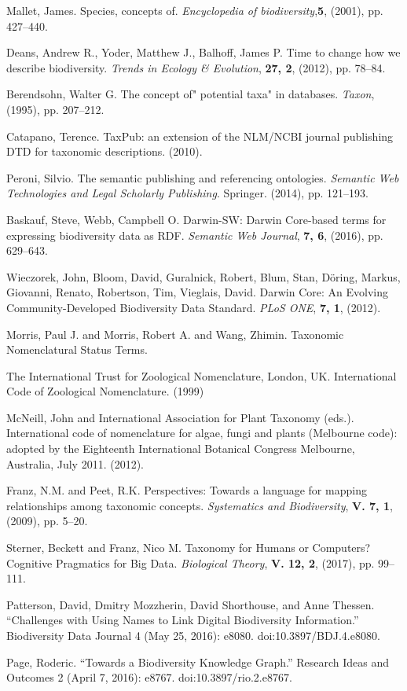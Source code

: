 \documentclass{IOS-Book-Article}
\begin{document}
\begin{thebibliography}{99}
Mallet, James. Species, concepts of. \textit{Encyclopedia of biodiversity},\textbf{5}, (2001), pp. 427--440.

Deans, Andrew R., Yoder, Matthew J., Balhoff, James P. Time to change how we describe biodiversity. \textit{Trends in Ecology \& Evolution}, \textbf{27, 2}, (2012), pp. 78--84.

Berendsohn, Walter G. The concept of" potential taxa" in databases. \textit{Taxon}, (1995), pp. 207--212.

Catapano, Terence. {TaxPub}: an extension of the {NLM}/{NCBI} journal publishing {DTD} for taxonomic descriptions. (2010).


Peroni, Silvio. The semantic publishing and referencing ontologies. \textit{Semantic {Web} {Technologies} and {Legal} {Scholarly} {Publishing}}. Springer. (2014), pp. 121--193.

Baskauf, Steve, Webb, Campbell O. Darwin-{SW}: {Darwin} {Core}-based terms for expressing biodiversity data as {RDF}. \textit{Semantic Web Journal}, \textbf{7, 6}, (2016), pp. 629--643.

Wieczorek, John, Bloom, David, Guralnick, Robert, Blum, Stan, Döring, Markus, Giovanni, Renato, Robertson, Tim, Vieglais, David. Darwin {Core}: {An} {Evolving} {Community}-{Developed} {Biodiversity} {Data} {Standard}. \textit{PLoS ONE}, \textbf{7, 1}, (2012).

Morris, Paul J. and Morris, Robert A. and Wang, Zhimin. Taxonomic {Nomenclatural} {Status} {Terms}.

{The International Trust for Zoological Nomenclature, London, UK}. International {Code} of {Zoological} {Nomenclature}. (1999)

McNeill, John and International Association for Plant Taxonomy (eds.). International code of nomenclature for algae, fungi and plants ({Melbourne} code): adopted by the {Eighteenth} {International} {Botanical} {Congress} {Melbourne}, {Australia}, {July} 2011. (2012).

Franz, N.M. and Peet, R.K. Perspectives: {Towards} a language for mapping relationships among taxonomic concepts. \textit{Systematics and Biodiversity}, \textbf{V. 7, 1}, (2009), pp. 5--20.

Sterner, Beckett and Franz, Nico M. Taxonomy for {Humans} or {Computers}? {Cognitive} {Pragmatics} for {Big} {Data}. \textit{Biological Theory}, \textbf{V. 12, 2}, (2017), pp. 99--111.

Patterson, David, Dmitry Mozzherin, David Shorthouse, and Anne Thessen. “Challenges with Using Names to Link Digital Biodiversity Information.” Biodiversity Data Journal 4 (May 25, 2016): e8080. doi:10.3897/BDJ.4.e8080.

Page, Roderic. “Towards a Biodiversity Knowledge Graph.” Research Ideas and Outcomes 2 (April 7, 2016): e8767. doi:10.3897/rio.2.e8767.


\end{thebibliography}
\end{document}
